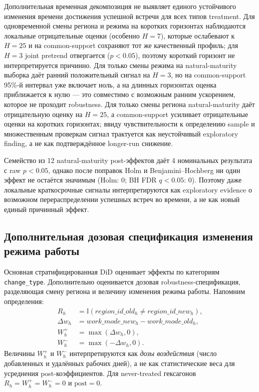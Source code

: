 \documentclass[14pt,a4paper]{extarticle}
\begin{document}
Дополнительная временная декомпозиция не выявляет единого устойчивого
изменения времени достижения успешной встречи для всех типов treatment.
Для одновременной смены региона и режима на коротких горизонтах наблюдаются
локальные отрицательные оценки (особенно \(H=7\)), которые ослабевают к
\(H=25\) и на common-support сохраняют тот же качественный профиль; для
\(H=3\) joint pretrend отвергается (\(p<0.05\)), поэтому короткий горизонт
не интерпретируется причинно. Для только смены режима на natural-maturity
выборка даёт ранний положительный сигнал на \(H=3\), но на common-support
95\%-й интервал уже включает ноль, а на длинных горизонтах оценка
приближается к нулю --- это совместимо с возможным ранним ускорением, которое
не проходит robustness. Для только смены региона natural-maturity даёт
отрицательную оценку на \(H=25\), а common-support усиливает отрицательные
оценки на коротких горизонтах; ввиду чувствительности к определению sample и
множественным проверкам сигнал трактуется как неустойчивый exploratory
finding, а не как подтверждённое longer-run снижение.

Семейство из 12 natural-maturity post-эффектов даёт 4 номинальных
результата с raw \(p<0.05\), однако после поправок Holm и Benjamini--Hochberg
ни один эффект не остаётся значимым (Holm: 0; BH FDR \(q<0.05\):
0). Поэтому даже локальные краткосрочные сигналы интерпретируются как
exploratory evidence о возможном перераспределении успешных встреч во
времени, а не как новый единый причинный эффект.


\subsection{Дополнительная дозовая спецификация изменения режима работы}
\label{subsec:dose_workmode_spec}

Основная стратифицированная DiD оценивает эффекты по категориям
\texttt{change\_type}. Дополнительно оценивается дозовая robustness-спецификация,
разделяющая смену региона и величину изменения режима работы. Напомним определения:
\[
\begin{aligned}
R_h &= \mathbb{I}(region\_id\_old_h \neq region\_id\_new_h),\\
\Delta w_h &= work\_mode\_new_h - work\_mode\_old_h,\\
W_h^+ &= \max(\Delta w_h,0),\\
W_h^- &= \max(-\Delta w_h,0).
\end{aligned}
\]
Величины \(W_h^+\) и \(W_h^-\) интерпретируются как \emph{дозы воздействия}
(число добавленных и удалённых рабочих дней), а не как статистические веса для
усреднения post-коэффициентов. Для never-treated гексагонов
\(R_h=W_h^+=W_h^-=0\) и \(\mathrm{post}=0\).
\end{document}

